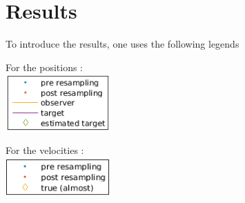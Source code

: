 \documentclass[english,DIV=13]{scrreprt}
\begin{document}
\section*{Results}
To introduce the results, one uses the following legends\\

	\begin{minipage}{.5\textwidth}
		\flushleft For the positions :\\
		 \center\includegraphics[width=4cm]{img/q4_legend1.png}
	\end{minipage}%
	\begin{minipage}{.3\textwidth}
		For the velocities :\\
		 \center\includegraphics[width=4cm]{img/q4_legend2.png}
	\end{minipage}
\end{document}
